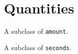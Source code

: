 \section{Quantities}
\label{sec:quantities}





A subclass of \texttt{amount}.


A subclass of \texttt{seconds}.